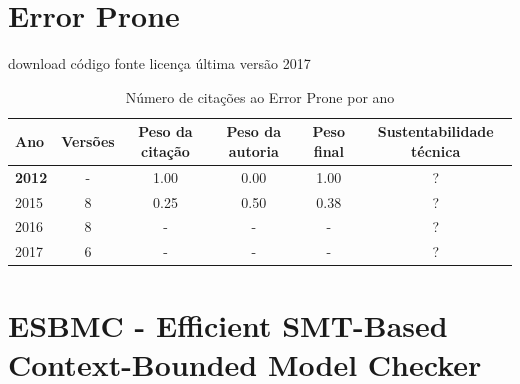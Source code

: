 \section{Error Prone}
\checkmark download
\checkmark código fonte
\checkmark licença
\checkmark última versão 2017



\begin{table}[H]
\caption{Número de citações ao Error Prone por ano}
\centering
\begin{tabular}{| l | c | c | c | c | c |}
  \hline
  Ano & Versões & Peso da citação & Peso da autoria & Peso final & Sustentabilidade técnica \\
  \hline
            {\bf 2012}
          &
          -
          &
          1.00
          &
          0.00
          &
            {\color{blue} 1.00}
          &
          ?
          \\
\hline
            2015
          &
          8
          &
          0.25
          &
          0.50
          &
            {\color{red} 0.38}
          &
          ?
          \\
\hline
        2016 & 8 & - & - & - & ? \\
\hline
        2017 & 6 & - & - & - & ? \\
\hline
\end{tabular}
\end{table}



\section{ESBMC - Efficient SMT-Based Context-Bounded Model Checker}



